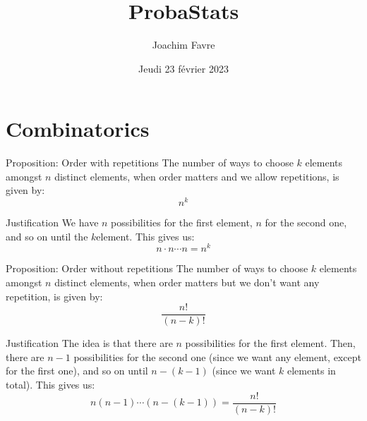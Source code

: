 \documentclass[a4paper]{article}
\title{ProbaStats}
\author{Joachim Favre}
\date{Jeudi 23 février 2023}
\begin{document}
\maketitle


\section{Combinatorics}
\begin{parag}{Proposition: Order with repetitions}
    The number of ways to choose $k$ elements amongst $n$ distinct elements, when order matters and we allow repetitions, is given by:
    \[n^k\]

    \begin{subparag}{Justification}
        We have $n$ possibilities for the first element, $n$ for the second one, and so on until the $k$\Th element. This gives us: 
        \[n \cdot n \cdots n = n^k\]
    \end{subparag}
\end{parag}

\begin{parag}{Proposition: Order without repetitions}
    The number of ways to choose $k$ elements amongst $n$ distinct elements, when order matters but we don't want any repetition, is given by:
    \[\frac{n!}{\left(n-k\right)!}\]

    \begin{subparag}{Justification}
        The idea is that there are $n$ possibilities for the first element. Then, there are $n-1$ possibilities for the second one (since we want any element, except for the first one), and so on until $n-\left(k-1\right)$ (since we want $k$ elements in total). This gives us: 
        \[n\left(n-1\right)\cdots \left(n-\left(k-1\right)\right) = \frac{n!}{\left(n-k\right)!}\]
    \end{subparag}
\end{parag}
\end{document}
